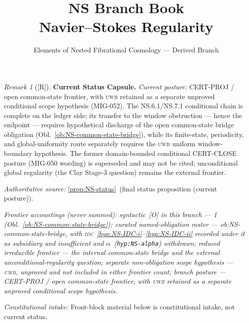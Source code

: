 \documentclass[12pt,oneside]{amsbook}
\theoremstyle{plain}
\theoremstyle{definition}
\theoremstyle{remark}
\newtheorem{remark}[theorem]{Remark}
\newcommand{\status}[1]{\textup{[#1]}}
\begin{document}
\title{NS Branch Book\\[6pt]Navier--Stokes Regularity}
\author{Elements of Nested Fibrational Cosmology --- Derived Branch}
\date{}
\maketitle

\tableofcontents

\bigskip


\begin{remark}[\status{R}]\label{cap:NS-status}
\textbf{Current Status Capsule.}
\emph{Current posture:} CERT-PROJ / open common-state frontier,
with \textsc{uwb} retained as a separate unproved conditional scope
hypothesis (MIG-052). The NS.6.1/NS.7.1 conditional chain is
complete on the ledger side; its transfer to the window obstruction
--- hence the endpoint --- requires hypothetical discharge of the
open common-state bridge obligation
(Obl.~\ref{ob:NS-common-state-bridge}), while its finite-state,
periodicity, and global-uniformity route separately requires the
\textsc{uwb} uniform window-boundary hypothesis. The former
domain-bounded conditional CERT-CLOSE posture (MIG-050 wording) is
superseded and may not be cited; unconditional global regularity
(the Clay Stage-3 question) remains the external frontier.

\emph{Authoritative source:} \ref{prop:NS-status}~(final status proposition (current posture)).

\emph{Frontier accountings (never summed): syntactic~[O] in this
branch --- 1 (Obl.~\ref{ob:NS-common-state-bridge}); curated
named-obligation roster --- ob:NS-common-state-bridge, with
\textsc{idc}~\eqref{hyp:NS-IDC-i}--\eqref{hyp:NS-IDC-ii} recorded
under it as subsidiary and insufficient and
$\alpha$~(\texttt{hyp:NS-alpha}) withdrawn; reduced irreducible
frontier --- the internal common-state bridge and the external
unconditional-regularity question; separate non-obligation scope
hypothesis --- \textsc{uwb}, unproved and not included in either
frontier count; branch posture --- CERT-PROJ / open common-state
frontier, with \textsc{uwb} retained as a separate unproved
conditional scope hypothesis.}

\emph{Constitutional intake:} Front-block material below is constitutional intake, not current status.
\end{remark}
\end{document}
